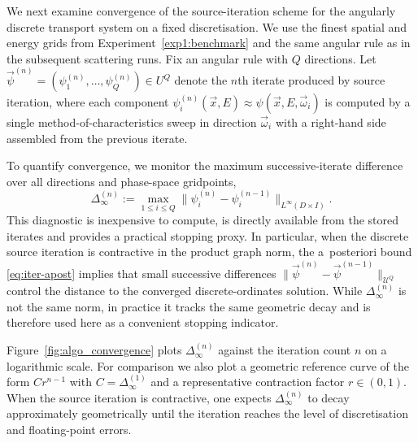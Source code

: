 \documentclass[final]{amsart}
\begin{document}
We next examine convergence of the source-iteration scheme for the
angularly discrete transport system on a fixed discretisation. We use
the finest spatial and energy grids from
Experiment~\ref{exp1:benchmark} and the same angular rule as in the
subsequent scattering runs. Fix an angular rule with $Q$
directions. Let
$\vec{\psi}^{ (n)}=(\psi^{(n)}_1,\dots,\psi^{(n)}_Q)\in U^Q$ denote
the $n$th iterate produced by source iteration, where each component
$\psi^{(n)}_i(\vec{x},E)\approx\psi(\vec{x},E,\vec{\omega}_i)$ is
computed by a single method-of-characteristics sweep in direction
$\vec{\omega}_i$ with a right-hand side assembled from the previous
iterate.

To quantify convergence, we monitor the maximum successive-iterate
difference over all directions and phase-space gridpoints,
\begin{equation}
  \label{eq:SI_diff_inf}
  \Delta_\infty^{(n)}
  :=
  \max_{1\le i\le Q} 
  \|\psi^{(n)}_i-\psi^{(n-1)}_i\|_{L^\infty(D\times I)}.
\end{equation}
This diagnostic is inexpensive to compute, is directly available from
the stored iterates and provides a practical stopping proxy. In
particular, when the discrete source iteration is contractive in the
product graph norm, the a~posteriori bound \eqref{eq:iter-apost}
implies that small successive differences
$\|\vec{\psi}^{ (n)}-\vec{\psi}^{ (n-1)}\|_{\mathcal U^Q}$ control
the distance to the converged discrete-ordinates solution. While
$\Delta_\infty^{(n)}$ is not the same norm, in practice it tracks the
same geometric decay and is therefore used here as a convenient
stopping indicator.

Figure~\ref{fig:algo_convergence} plots $\Delta_\infty^{(n)}$ against
the iteration count $n$ on a logarithmic scale. For comparison we also
plot a geometric reference curve of the form $C r^{ n-1}$ with
$C=\Delta_\infty^{(1)}$ and a representative contraction factor
$r\in(0,1)$.  When the source iteration is contractive, one expects
$\Delta_\infty^{(n)}$ to decay approximately geometrically until the
iteration reaches the level of discretisation and floating-point
errors.
\end{document}
